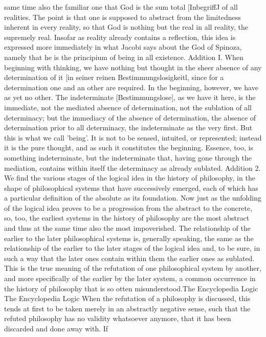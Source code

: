 same time also the familiar one that God is the sum total [InbegriffJ of
all realities. The point is that one is supposed to abstract from the
limitedness inherent in every reality, so that God is nothing but the
real in all reality, the supremely real. Insofar as reality already contains
a reflection, this idea is expressed more immediately in what Jacobi
says about the God of Spinoza, namely that he is the principium of
being in all existence.
Addition I. When beginning with thinking, we have nothing but thought in
the sheer absence of any determination of it [in seiner reinen Bestimmungslosigkeitl,
since for a determination one and an other are required. In the beginning, however,
we have as yet no other. The indeterminate [Bestimmungslose], as we have it here,
is the immediate, not the mediated absence of determination, not the sublation of
all determinacy; but the immediacy of the absence of determination, the absence
of determination prior to all determinacy, the indeterminate as the very first. But
this is what we call 'being'. It is not to be sensed, intuited, or represented; instead
it is the pure thought, and as such it constitutes the beginning. Essence, too, is
something indeterminate, but the indeterminate that, having gone through the
mediation, contains within itself the determinacy as already sublated.
Addition 2. We find the various stages of the logical idea in the history of
philosophy, in the shape of philosophical systems that have successively emerged,
each of which has a particular definition of the absolute as its foundation. Now
just as the unfolding of the logical idea proves to be a progression from the
abstract to the concrete, so, too, the earliest systems in the history of philosophy
are the most abstract and thus at the same time also the most impoverished. The
relationship of the earlier to the later philosophical systems is, generally speaking,
the same as the relationship of the earlier to the later stages of the logical idea
and, to be sure, in such a way that the later ones contain within them the earlier
ones as sublated. This is the true meaning of the refutation of one philosophical
system by another, and more specifically of the earlier by the later system, a
common occurrence in the history of philosophy that is so otten misunderstood.The Encyclopedia Logic The Encyclopedia Logic
When the refutation of a philosophy is discussed, this tends at first to be taken
merely in an abstractly negative sense, such that the refuted philosophy has no
validity whatsoever anymore, that it has been discarded and done away with. If
